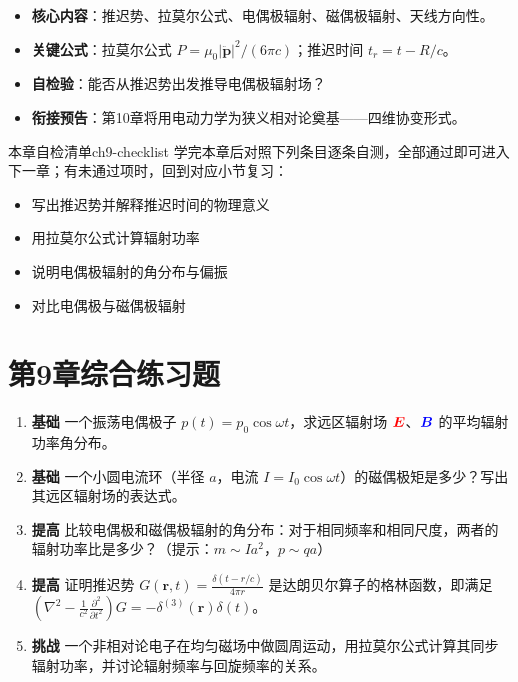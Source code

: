 \documentclass[11pt,a4paper,openany,oneside]{book}
\newcommand{\vecE}{\textcolor{red}{\vect{E}}}
\newcommand{\vecB}{\textcolor{blue}{\vect{B}}}
\newcommand{\vect}[1]{\bm{#1}}
\newcommand{\lap}{\nabla^2}
\begin{document}
\begin{chapterreview}
\begin{itemize}[nosep]
\item \textbf{核心内容}：推迟势、拉莫尔公式、电偶极辐射、磁偶极辐射、天线方向性。
\item \textbf{关键公式}：拉莫尔公式 $P = \mu_0|\ddot{\vect{p}}|^2/(6\pi c)$；推迟时间 $t_r = t - R/c$。
\item \textbf{自检验}：能否从推迟势出发推导电偶极辐射场？
\item \textbf{衔接预告}：第10章将用电动力学为狭义相对论奠基——四维协变形式。
\end{itemize}
\end{chapterreview}

\begin{tip}{本章自检清单}{ch9-checklist}
学完本章后对照下列条目逐条自测，全部通过即可进入下一章；有未通过项时，回到对应小节复习：
\begin{itemize}[label=$\square$, nosep]
\item 写出推迟势并解释推迟时间的物理意义
\item 用拉莫尔公式计算辐射功率
\item 说明电偶极辐射的角分布与偏振
\item 对比电偶极与磁偶极辐射
\end{itemize}
\end{tip}

\section*{第9章综合练习题}
\begin{enumerate}[label=\textbf{\arabic*.}]
\item \textbf{基础} 一个振荡电偶极子 $p(t)=p_0\cos\omega t$，求远区辐射场 $\vecE$、$\vecB$ 的平均辐射功率角分布。
\item \textbf{基础} 一个小圆电流环（半径 $a$，电流 $I=I_0\cos\omega t$）的磁偶极矩是多少？写出其远区辐射场的表达式。
\item \textbf{提高} 比较电偶极和磁偶极辐射的角分布：对于相同频率和相同尺度，两者的辐射功率比是多少？（提示：$m\sim Ia^2$，$p\sim qa$）
\item \textbf{提高} 证明推迟势 $G(\vect{r},t)=\frac{\delta(t-r/c)}{4\pi r}$ 是达朗贝尔算子的格林函数，即满足 $\left(\lap-\frac{1}{c^2}\frac{\partial^2}{\partial t^2}\right)G=-\delta^{(3)}(\vect{r})\delta(t)$。
\item \textbf{挑战} 一个非相对论电子在均匀磁场中做圆周运动，用拉莫尔公式计算其同步辐射功率，并讨论辐射频率与回旋频率的关系。
\end{enumerate}
\newpage
\end{document}
